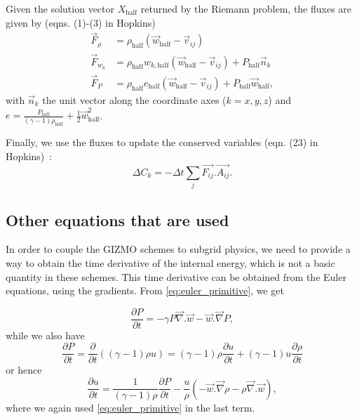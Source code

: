 Given the solution vector $X_\text{half}$ returned by the Riemann problem, the fluxes are given by (eqns. (1)-(3) in Hopkins)
\begin{align}
	\vec{F}_\rho &= 
		\rho_\text{half} \left( \vec{w}_\text{half} - \vec{v}_{ij}\right)\\
	\vec{F}_{w_k} &= 
		\rho_\text{half} w_{k, \text{half}} \left( \vec{w}_\text{half} - \vec{v}_{ij} \right) + P_\text{half} \vec{n}_k\\
	\vec{F}_P &= 
		\rho_\text{half} e_\text{half} \left( \vec{w}_\text{half} - \vec{v}_{ij}\right) + P_\text{half} \vec{w}_\text{half},
\end{align}
with $\vec{n}_k$ the unit vector along the coordinate axes ($k=x,y,z$) and $e = \frac{P_\text{half}}{\left(\gamma -1\right)\rho_\text{half}} + \frac{1}{2}\vec{w}_\text{half}^2$.

Finally, we use the fluxes to update the conserved variables (eqn. (23) in Hopkins)~:
\begin{equation}
	\Delta C_k = -\Delta t \sum_j \vec{F_{ij}}.\vec{A_{ij}}.
\end{equation}

\subsection{Other equations that are used}

In order to couple the GIZMO schemes to subgrid physics, we need to provide a way to obtain the time 
derivative of the internal energy, which is not a basic quantity in these schemes. This time derivative can be 
obtained from the Euler equations, using the gradients. From \eqref{eq:euler_primitive}, we get

\begin{equation}
\frac{\partial{}P}{\partial{}t} = -\gamma{}P \vec{\nabla{}}.\vec{w} - \vec{w}.\vec{\nabla{}}P,
\end{equation}
while we also have
\begin{equation}
\frac{\partial{}P}{\partial{}t} = \frac{\partial{}}{\partial{}t} \left(
  (\gamma{}-1) \rho{} u
\right) = (\gamma{}-1)\rho{}\frac{\partial{}u}{\partial{}t} + (\gamma{}-1)u\frac{\partial{}\rho{}}{\partial{}t}
\end{equation}
or hence
\begin{equation}
\frac{\partial{}u}{\partial{}t} = \frac{1}{(\gamma{}-1)\rho{}} \frac{\partial{}P}{\partial{}t} -
\frac{u}{\rho{}} \left( -\vec{w}.\vec{\nabla{}}\rho{} - \rho{}\vec{\nabla{}}.\vec{w} \right),
\end{equation}
where we again used \eqref{eq:euler_primitive} in the last term.

